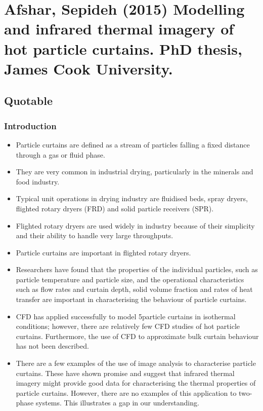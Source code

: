 \documentclass[12pt]{article}
\begin{document}
	
	\section{Afshar, Sepideh (2015) Modelling and infrared thermal imagery of hot particle curtains. PhD thesis, James Cook University.}
	
	\subsection{Quotable}
	
		\subsubsection{Introduction}
			\begin{itemize}
				\item Particle curtains are defined as a stream of particles falling a fixed distance through a gas or fluid
				phase. 
				\item They are very common in industrial drying, particularly in the minerals and food industry.
				\item Typical unit operations in drying
				industry are fluidised beds, spray dryers, flighted rotary dryers (FRD) and solid particle receivers
				(SPR).
				\item Flighted rotary dryers are used widely in industry because of their simplicity and their
				ability to handle very large throughputs.
				\item Particle curtains are important in flighted rotary dryers.
				\item Researchers have found that the properties of the individual particles, such as particle
				temperature and particle size, and the operational characteristics such as flow rates and curtain
				depth, solid volume fraction and rates of heat transfer are important in characterising the behaviour
				of particle curtains.
				\item CFD has applied successfully to model
				5particle curtains in isothermal conditions; however, there are relatively few CFD studies of hot
				particle curtains. Furthermore, the use of CFD to approximate bulk curtain behaviour has not been
				described.
				\item There are a few examples of the use of image analysis to characterise particle curtains.
				These have shown promise and suggest that infrared thermal imagery might provide good data for
				characterising the thermal properties of particle curtains. However, there are no examples of this
				application to two-phase systems. This illustrates a gap in our understanding.
			\end{itemize}
		 
\end{document}
